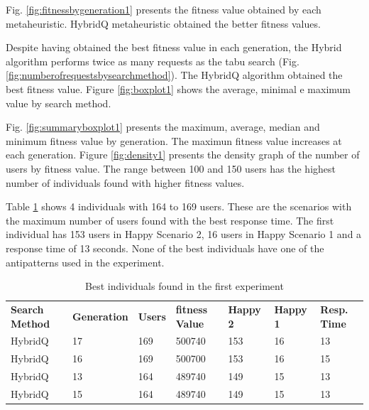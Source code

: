 \documentclass{bmcart}
\begin{document}
Fig. \ref{fig:fitnessbygeneration1}  presents the fitness value obtained by each metaheuristic. HybridQ metaheuristic obtained the better fitness values.  








Despite having obtained the best fitness value in each generation, the Hybrid algorithm performs twice as many requests as the  tabu search (Fig. \ref{fig:numberofrequestsbysearchmethod}). The HybridQ algorithm obtained the best fitness value. Figure \ref{fig:boxplot1} shows the average, minimal e maximum value by search method.

Fig. \ref{fig:summaryboxplot1} presents the maximum, average, median and minimum fitness value by generation. The maximun fitness value increases at each generation. Figure \ref{fig:density1} presents the density graph of the number of users by fitness value. The range between 100 and 150 users has the highest number of individuals found with higher fitness values.


Table \ref{tab:bestindividuals} shows 4 individuals with 164 to 169 users. These are the scenarios with the maximum number of users found with the best response time. The first individual has 153 users in Happy Scenario 2, 16 users in Happy Scenario 1 and a response time of 13 seconds. None of the best individuals have one of the antipatterns used in the experiment.



\begin{table}[h]
\centering
\caption{Best individuals found in the first experiment}
\label{tab:bestindividuals}
\begin{tabular}{lllllll}
\rowcolor[HTML]{C0C0C0} 
\textbf{Search Method} & \textbf{Generation} & \textbf{Users} & \textbf{fitness Value} & \textbf{Happy 2} & \textbf{Happy 1} & \textbf{Resp. Time} \\
HybridQ & 17 & 169 & 500740 & 153 & 16 & 13 \\
HybridQ & 16 & 169 & 500700 & 153 & 16 & 15 \\
HybridQ & 13 & 164 & 489740 & 149 & 15 & 13 \\
HybridQ & 15 & 164 & 489740 & 149 & 15 & 13
\end{tabular}
\end{table}
\end{document}
